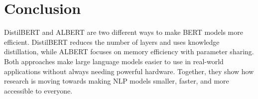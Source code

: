 \documentclass[11pt]{article}
\begin{document}
\section{Conclusion}
DistilBERT and ALBERT are two different ways to make BERT models more efficient. 
DistilBERT reduces the number of layers and uses knowledge distillation, while ALBERT focuses on memory efficiency with parameter sharing. 
Both approaches make large language models easier to use in real-world applications without always needing powerful hardware. 
Together, they show how research is moving towards making NLP models smaller, faster, and more accessible to everyone.
\end{document}
